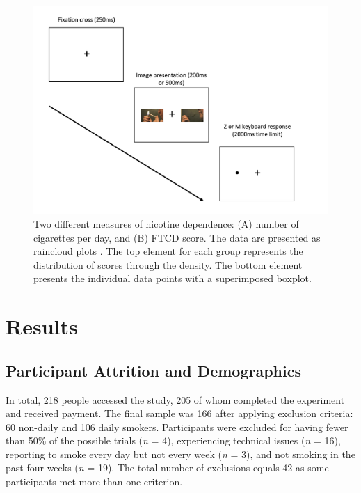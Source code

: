 \documentclass[empirical, authordate]{jote-new-article}
\begin{document}
\begin{figure}[h!]

  \begin{fullwidth}
    \includegraphics[width=\linewidth]{media/image2.jpeg}
    \caption{
      Two different measures of nicotine dependence: (A) number of cigarettes per day, and (B) FTCD score. The data are presented as raincloud plots \parencite{Allen2019}. The top element for each group represents the distribution of scores through the density. The bottom element presents the individual data points with a superimposed boxplot.
    }
    \label{fig:2}

  \end{fullwidth}

\end{figure}

\section{Results}

\subsection{Participant Attrition and Demographics}

In total, 218 people accessed the study, 205 of whom completed the experiment and received payment. The final sample was 166 after applying exclusion criteria: 60 non-daily and 106 daily smokers. Participants were excluded for having fewer than 50\% of the possible trials (\emph{n} = 4), experiencing technical issues (\emph{n} = 16), reporting to smoke every day but not every week (\emph{n} = 3), and not smoking in the past four weeks (\emph{n} = 19). The total number of exclusions equals 42 as some participants met more than one criterion.
\end{document}
